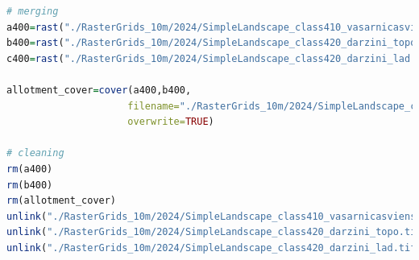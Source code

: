 \documentclass[
]{book}
\begin{document}
\begin{lstlisting}[language=R]
# merging
a400=rast("./RasterGrids_10m/2024/SimpleLandscape_class410_vasarnicasviensetas_topo.tif")
b400=rast("./RasterGrids_10m/2024/SimpleLandscape_class420_darzini_topo.tif")
c400=rast("./RasterGrids_10m/2024/SimpleLandscape_class420_darzini_lad.tif")

allotment_cover=cover(a400,b400,
                     filename="./RasterGrids_10m/2024/SimpleLandscape_class400_varnicas_premask.tif",
                     overwrite=TRUE)

# cleaning
rm(a400)
rm(b400)
rm(allotment_cover)
unlink("./RasterGrids_10m/2024/SimpleLandscape_class410_vasarnicasviensetas_topo.tif")
unlink("./RasterGrids_10m/2024/SimpleLandscape_class420_darzini_topo.tif")
unlink("./RasterGrids_10m/2024/SimpleLandscape_class420_darzini_lad.tif")
\end{lstlisting}
\end{document}
